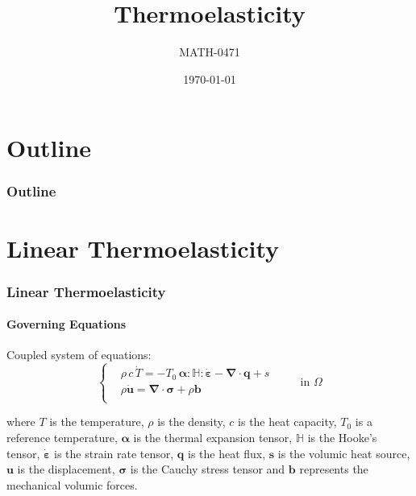 \documentclass[10pt,xcolor=pdftex,dvipsnames,table]{beamer}
\title{Thermoelasticity}
\author{ MATH-0471 }
\date{\today}
\begin{document}
\frame{\titlepage}

\section*{Outline}

\begin{frame}
	\frametitle{Outline}
	\tableofcontents
\end{frame}

\section{ Linear Thermoelasticity  }


\begin{frame}
	\frametitle{ Linear Thermoelasticity }
	\framesubtitle{ Governing Equations }
	
	Coupled system of equations:
	\begin{equation*}
				\left\{
		\begin{aligned}
			&  \rho\,c\,\dot{T} = - T_0\,\boldsymbol{\alpha}:\mathbb{H}:\dot{\boldsymbol{\varepsilon}} - \boldsymbol{\nabla}\cdot\boldsymbol{q} + s\\
			&		\rho \ddot{\boldsymbol{u}} = \boldsymbol{\nabla}\cdot\boldsymbol{\sigma} + \rho\boldsymbol{b} \\
					\end{aligned}
		\right. \qquad \text{ in } \Omega   
	\end{equation*}
	
	where $T$ is the temperature, $\rho$ is the density, $c$ is the heat capacity, $T_0$ is a reference temperature, $\boldsymbol{\alpha}$ is the thermal expansion tensor, $\mathbb{H}$  is the Hooke's tensor, $\dot{\boldsymbol{\varepsilon}}$ is the strain rate tensor, $\boldsymbol{q}$ is the heat flux, $\boldsymbol{s}$ is the volumic heat source, 
	$\boldsymbol{u}$ is the displacement,  $\boldsymbol{\sigma}$ is the Cauchy stress tensor and $\boldsymbol{b}$ represents the mechanical volumic forces.

\end{frame}
\end{document}

